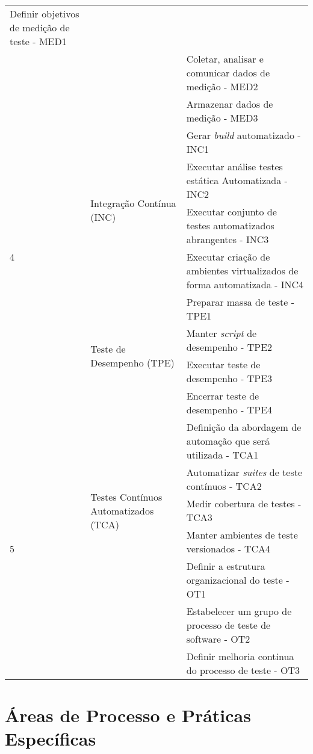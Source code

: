 \begin{table}[H]
{\begin{tabular}{|p{20mm}|p{76mm}|p{150mm}|}
        Definir objetivos de medição de teste - MED1\\ 
    \cline{3-3}
        & & Coletar, analisar e comunicar dados de medição - MED2\\
    \cline{3-3}
        & & Armazenar dados de medição - MED3\\ 
    \hline
        \multirow{7}{*}{4}& 
        \multirow{4}{*}{Integração Contínua (INC)}& 
        Gerar \textit{build} automatizado - INC1\\ 
    \cline{3-3} 
        & & Executar análise testes estática Automatizada - INC2\\ 
    \cline{3-3}
        & & Executar conjunto de testes automatizados abrangentes - INC3\\ 
    \cline{3-3}
        & & Executar criação de ambientes virtualizados  de forma automatizada - INC4 \\ 

    \cline{2-3}
        & \multirow{4}{*}{Teste de Desempenho (TPE)}& 
        Preparar massa de teste - TPE1\\ 
    \cline{3-3}
        & & Manter \textit{script} de desempenho - TPE2\\ 
    \cline{3-3}
        & & Executar teste de desempenho - TPE3\\ 
    \cline{3-3}
        & & Encerrar teste de desempenho - TPE4\\ 
    \hline
        \multirow{8}{*}{5}&
        \multirow{5}{*}{Testes Contínuos Automatizados (TCA)}&
        Definição da abordagem de automação que será utilizada - TCA1\\ 
    \cline{3-3}
        & & Automatizar \textit{suites} de teste contínuos - TCA2\\
    \cline{3-3}
        & & Medir cobertura de testes - TCA3\\ 
    \cline{3-3}
        & & Manter ambientes de teste versionados - TCA4\\ 
    \cline{2-3}
        & \multirow{3}{*}{Otimização dos Teste (OT)}& 
        Definir a estrutura organizacional do teste - OT1\\
    \cline{3-3}
        & & Estabelecer um grupo de processo de teste de software - OT2\\ 
    \cline{3-3}
        & & Definir melhoria continua do processo de teste - OT3\\ 
    \hline
    \end{tabular}
}
\end{table}


\section{Áreas de Processo e Práticas Específicas}
\label{sec:areasdeprocessoepraticas}



